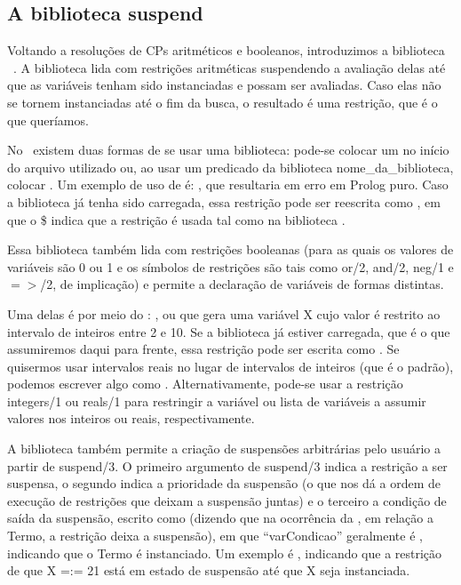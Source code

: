 \documentclass{article}
\begin{document}
\subsection{A biblioteca suspend}

Voltando a resoluções de CPs aritméticos e booleanos, introduzimos a biblioteca \eclipse\ . A biblioteca  lida com restrições aritméticas suspendendo a avaliação delas até que as variáveis tenham sido instanciadas e possam ser avaliadas. Caso elas não se tornem instanciadas até o fim da busca, o resultado é uma restrição, que é o que queríamos.

No \eclipse\ existem duas formas de se usar uma biblioteca: pode-se colocar um  no início do arquivo utilizado ou, ao usar um predicado da biblioteca nome\_da\_biblioteca, colocar . Um exemplo de uso de  é: , que resultaria em erro em Prolog puro. Caso a biblioteca  já tenha sido carregada, essa restrição pode ser reescrita como ,
em que o \$ indica que a restrição é usada tal como na biblioteca .

Essa biblioteca também lida com restrições booleanas (para as quais os valores de variáveis são 0 ou 1 e os símbolos de restrições são tais como or/2, and/2, neg/1 e $=>$/2, de implicação) e permite a declaração de variáveis de formas distintas.

Uma delas é por meio do : , ou   %
que gera uma variável X cujo valor é restrito ao intervalo de inteiros entre 2 e 10. Se a biblioteca já estiver carregada, que é o que assumiremos daqui para frente, essa restrição pode ser escrita como . %
Se quisermos usar intervalos reais no lugar de intervalos de inteiros (que é o padrão), podemos escrever algo como .
Alternativamente, pode-se usar a restrição integers/1 ou reals/1 para restringir a variável ou lista de variáveis a assumir valores nos inteiros ou reais, respectivamente.



A biblioteca  também permite a criação de suspensões arbitrárias pelo usuário a partir de suspend/3. O primeiro argumento de suspend/3 indica a restrição a ser suspensa, o segundo indica a prioridade da suspensão (o que nos dá a ordem de execução de restrições que deixam a suspensão juntas) e o terceiro a condição de saída da suspensão, escrito como  (dizendo que na ocorrência da , em relação a Termo, a restrição deixa a suspensão), em que
``var{Condicao}'' geralmente é , indicando que o Termo é instanciado.
Um exemplo é , indicando que a restrição de que X =:= 21 está em estado de suspensão até que X seja instanciada.
\end{document}
